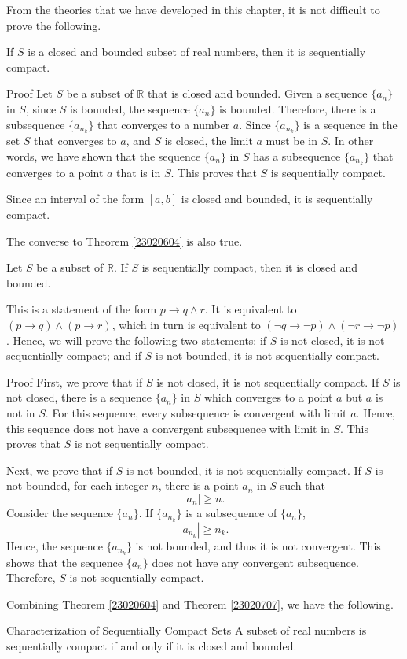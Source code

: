  From the theories that we have developed in this chapter, it is not difficult to prove the following.
 \begin{theorem}[label=23020604]{}
 If $S$ is a closed and bounded subset of real numbers, then it is sequentially compact.
 \end{theorem}
 \begin{myproof}{Proof}
 Let $S$ be a subset of $\mathbb{R}$ that is closed and bounded.  Given a sequence $\{a_n\}$ in $S$, since $S$ is bounded,   the sequence $\{a_n\}$ is bounded. Therefore, there is a subsequence $\{a_{n_k}\}$ that converges to a number $a$. Since $\{a_{n_k}\}$ is a sequence in the  set $S$ that converges to  $a$, and $S$ is closed,  the limit $a$ must be in $S$. In other words, we have shown that the sequence $\{a_n\}$ in $S$ has a subsequence $\{a_{n_k}\}$ that converges to  a point $a$ that is in $S$. This proves that $S$ is sequentially compact.
 \end{myproof}
 
 \begin{example}{}
 Since an interval of the form $[a,b]$ is closed and bounded, it is sequentially compact.
 \end{example}
 
 The converse to Theorem \ref{23020604} is also true.
 \begin{theorem}[label=23020707]{}
Let $S$ be a subset of $\mathbb{R}$. If $S$ is sequentially compact, then it is closed and bounded.
 \end{theorem}
 This is a statement of the form $p\to q\wedge r$. It is equivalent to $(p\to q)\wedge (p\to r)$, which in turn is equivalent to $(\neg q\to \neg p)\wedge (\neg r\to \neg p)$. Hence, we will prove the following two statements: if $S$ is not closed, it is not sequentially compact; and if $S$ is not bounded, it is not sequentially compact.
 \begin{myproof}{Proof}
 First, we prove that if $S$ is not closed, it is not sequentially compact. If $S$ is not closed, there is a sequence $\{a_n\}$ in $S$ which converges to a point $a$ but $a$ is not in $S$. For this sequence, every subsequence is convergent with limit $a$. Hence, this sequence does not have a convergent subsequence with limit in $S$. This proves that $S$ is not sequentially compact.
 
 Next, we prove that if $S$ is not bounded, it is not sequentially compact. If $S$ is not bounded, for each integer $n$, there is a point $a_n$ in $S$ such that
 \[|a_n|\geq n.\]Consider the sequence $\{a_n\}$. If $\{a_{n_k}\}$ is a subsequence of $\{a_n\}$,
 \[|a_{n_k}|\geq n_k.\] Hence, the sequence
  $\{a_{n_k}\}$ is not bounded, and thus it is not convergent. This shows that the sequence $\{a_n\}$ does not have any convergent subsequence. Therefore, $S$ is not sequentially compact.
 
  
 \end{myproof}
 Combining Theorem \ref{23020604} and Theorem \ref{23020707}, we have the following.
 \begin{highlight}{Characterization of Sequentially Compact Sets}
 A subset of real numbers is sequentially compact if and only if it is closed and bounded.
 \end{highlight}
 
